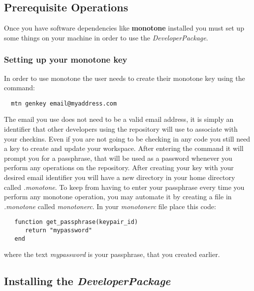 \documentclass[12pt]{article}
\begin{document}
\subsection*{Prerequisite Operations}

Once you have software dependencies like {\bf monotone} installed you must set up some things on your machine in order to use the {\it DeveloperPackage}. 

\subsubsection*{Setting up your monotone key}

In order to use monotone the user needs to create their monotone key using the command:

\begin{verbatim}
  mtn genkey email@myaddress.com
\end{verbatim}
The email you use does not need to be a valid email address, it is simply an identifier that other developers using the repository will use to associate with your checkins. Even if you are not going to be checking in any code you still need a key to create and update your workspace. After entering the command it will prompt you for a passphrase, that will be used as a password whenever you perform any operations on the repository.
 After creating your key with your desired email identifier you will have a new directory in your home directory called {\it .monotone}. To keep from having to enter your passphrase every time you perform any monotone operation, you may automate it by creating a file in {\it .monotone} called {\it monotonerc}. In your {\it monotonerc} file place this code:
 
\begin{verbatim}
   function get_passphrase(keypair_id)	
      return "mypassword"
   end
\end{verbatim}
where the text {\it mypassword} is your passphrase, that you created earlier. 

\subsection*{Installing the {\emph{DeveloperPackage}}}
\end{document}
